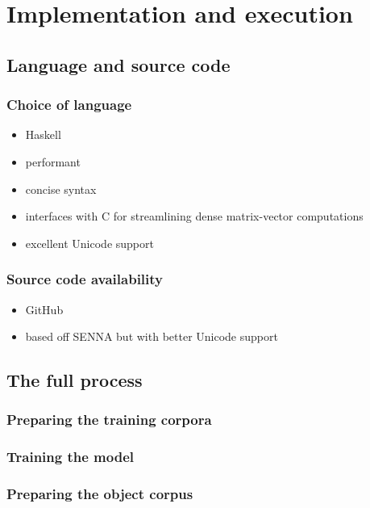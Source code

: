 
\chapter{Implementation and execution}
\label{chp:implementation}

\section{Language and source code}
\label{sec:langsource}
\subsection{Choice of language}
\label{sec:language}

\begin{itemize}
\item Haskell
\item performant
\item concise syntax
\item interfaces with C for streamlining dense matrix-vector computations
\item excellent Unicode support
\end{itemize}

\subsection{Source code availability}
\label{sec:sourcecode}

\begin{itemize}
\item GitHub
\item based off SENNA but with better Unicode support
\end{itemize}

\section{The full process}
\label{sec:process}
\subsection{Preparing the training corpora}
\label{sec:trainingcorpora}
\subsection{Training the model}
\label{sec:createmodel}
\subsection{Preparing the object corpus}
\label{sec:createmodel}
